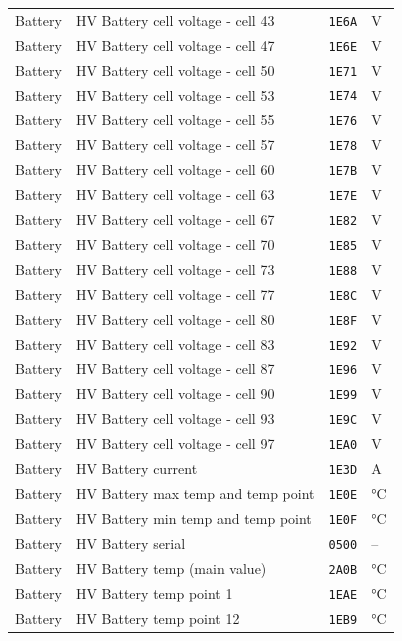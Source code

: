 \begin{longtable}{@{}llll@{}}
Battery & HV Battery cell voltage - cell 43 & \texttt{1E6A} & V \\
Battery & HV Battery cell voltage - cell 47 & \texttt{1E6E} & V \\
Battery & HV Battery cell voltage - cell 50 & \texttt{1E71} & V \\
Battery & HV Battery cell voltage - cell 53 & \texttt{1E74} & V \\
Battery & HV Battery cell voltage - cell 55 & \texttt{1E76} & V \\
Battery & HV Battery cell voltage - cell 57 & \texttt{1E78} & V \\
Battery & HV Battery cell voltage - cell 60 & \texttt{1E7B} & V \\
Battery & HV Battery cell voltage - cell 63 & \texttt{1E7E} & V \\
Battery & HV Battery cell voltage - cell 67 & \texttt{1E82} & V \\
Battery & HV Battery cell voltage - cell 70 & \texttt{1E85} & V \\
Battery & HV Battery cell voltage - cell 73 & \texttt{1E88} & V \\
Battery & HV Battery cell voltage - cell 77 & \texttt{1E8C} & V \\
Battery & HV Battery cell voltage - cell 80 & \texttt{1E8F} & V \\
Battery & HV Battery cell voltage - cell 83 & \texttt{1E92} & V \\
Battery & HV Battery cell voltage - cell 87 & \texttt{1E96} & V \\
Battery & HV Battery cell voltage - cell 90 & \texttt{1E99} & V \\
Battery & HV Battery cell voltage - cell 93 & \texttt{1E9C} & V \\
Battery & HV Battery cell voltage - cell 97 & \texttt{1EA0} & V \\
Battery & HV Battery current & \texttt{1E3D} & A \\
Battery & HV Battery max temp and temp point & \texttt{1E0E} & °C \\
Battery & HV Battery min temp and temp point & \texttt{1E0F} & °C \\
Battery & HV Battery serial & \texttt{0500} & -- \\
Battery & HV Battery temp (main value) & \texttt{2A0B} & °C \\
Battery & HV Battery temp point 1 & \texttt{1EAE} & °C \\
Battery & HV Battery temp point 12 & \texttt{1EB9} & °C \\

\end{longtable}
